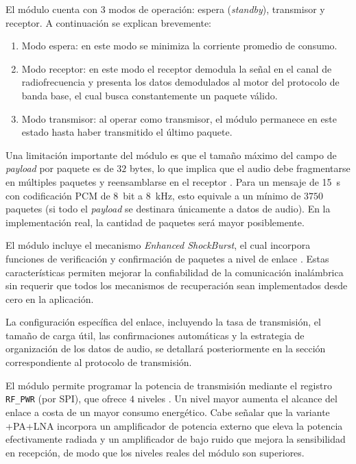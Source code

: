 El módulo cuenta con $3$ modos de operación: espera (\textit{standby}), transmisor y receptor.
A continuación se explican brevemente:
\begin{enumerate}
    \item Modo espera: en este modo se minimiza la corriente promedio de consumo.
    \item Modo receptor: en este modo el receptor demodula la señal en el canal de radiofrecuencia y presenta los datos demodulados al motor del protocolo de banda base, el cual busca constantemente un paquete válido.
    \item Modo transmisor: al operar como transmisor, el módulo permanece en este estado hasta haber transmitido el último paquete.
\end{enumerate}

Una limitación importante del módulo es que el tamaño máximo del campo de \textit{payload} por paquete es de $32$ bytes, lo que implica que el audio debe fragmentarse en múltiples paquetes y reensamblarse en el receptor \cite{nordic}.
Para un mensaje de \SI{15}{\second} con codificación PCM de \SI{8}{bit} a \SI{8}{\kilo\hertz}, esto equivale a un mínimo de $3750$ paquetes (si todo el \textit{payload} se destinara únicamente a datos de audio).
En la implementación real, la cantidad de paquetes será mayor posiblemente.

El módulo incluye el mecanismo \textit{Enhanced ShockBurst}, el cual incorpora funciones de verificación y confirmación de paquetes a nivel de enlace \cite{nordic}.
Estas características permiten mejorar la confiabilidad de la comunicación inalámbrica sin requerir que todos los mecanismos de recuperación sean implementados desde cero en la aplicación.

La configuración específica del enlace, incluyendo la tasa de transmisión, el tamaño de carga útil, las confirmaciones automáticas y la estrategia de organización de los datos de audio, se detallará posteriormente en la sección correspondiente al protocolo de transmisión.

El módulo permite programar la potencia de transmisión mediante el registro \texttt{RF\_PWR} (por SPI), que ofrece $4$ niveles \cite{nordic}.
Un nivel mayor aumenta el alcance del enlace a costa de un mayor consumo energético.
Cabe señalar que la variante +PA+LNA incorpora un amplificador de potencia externo que eleva la potencia efectivamente radiada y un amplificador de bajo ruido que mejora la sensibilidad en recepción, de modo que los niveles reales del módulo son superiores.

